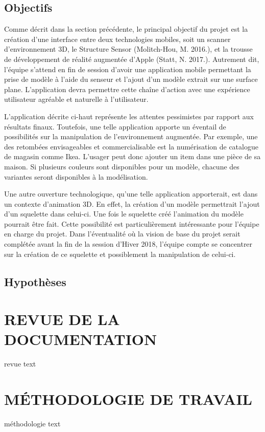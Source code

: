 \documentclass[letterpaper,twoside,12pt,french]{report}
\begin{document}
\section*{Objectifs}
Comme décrit dans la section précédente, le principal objectif du projet est la création d'une
interface entre deux technologies mobiles, soit un scanner d'environnement 3D, le Structure
Sensor (Molitch-Hou, M. 2016.), et la trousse de développement de réalité augmentée d'Apple
(Statt, N. 2017.). Autrement dit, l'équipe s'attend en fin de session d'avoir une application mobile
permettant la prise de modèle à l'aide du senseur et l'ajout d'un modèle extrait sur une surface
plane. L'application devra permettre cette chaîne d'action avec une expérience utilisateur
agréable et naturelle à l'utilisateur.
\par
L'application décrite ci-haut représente les attentes pessimistes par rapport aux résultats finaux.
Toutefois, une telle application apporte un éventail de possibilités sur la manipulation de
l'environnement augmentée. Par exemple, une des retombées envisageables et
commercialisable est la numérisation de catalogue de magasin comme Ikea. L'usager peut
donc ajouter un item dans une pièce de sa maison. Si plusieurs couleurs sont disponibles pour
un modèle, chacune des variantes seront disponibles à la modélisation.
\par
Une autre ouverture technologique, qu'une telle application apporterait, est dans un contexte
d'animation 3D. En effet, la création d'un modèle permettrait l'ajout d'un squelette dans celui-ci.
Une fois le squelette créé l'animation du modèle pourrait être fait. Cette possibilité est
particulièrement intéressante pour l'équipe en charge du projet. Dans l'éventualité où la vision
de base du projet serait complétée avant la fin de la session d'Hiver 2018, l'équipe compte se
concentrer sur la création de ce squelette et possiblement la manipulation de celui-ci.
\section*{Hypothèses}
\chapter*{\uppercase{Revue de la documentation}}
revue text
\chapter*{\uppercase{Méthodologie de travail}}
méthodologie text
\end{document}
